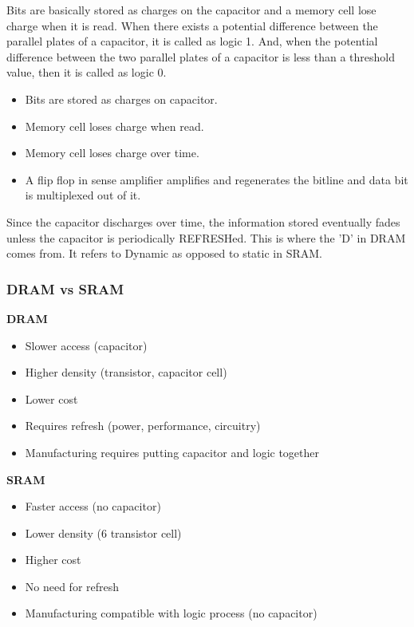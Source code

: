 Bits are basically stored as charges on the capacitor and a memory cell lose charge when it is read. When there exists a potential difference between the parallel plates of a capacitor, it is called as logic 1. And, when the potential difference between the two parallel plates of a capacitor is less than a threshold value, then it is called as logic 0. 

\begin{itemize}
    \item Bits are stored as charges on capacitor.
    \item Memory cell loses charge when read.
    \item Memory cell loses charge over time.
    \item A flip flop in sense amplifier amplifies and regenerates the bitline and data bit is multiplexed out of it.
\end{itemize}

Since the capacitor discharges over time, the information stored eventually fades unless the capacitor is periodically REFRESHed. This is where the 'D' in DRAM comes from. It refers to Dynamic as opposed to static in SRAM.

\subsubsection{DRAM vs SRAM}
\textbf{DRAM}
\begin{itemize}
    \item Slower access (capacitor)
    \item Higher density (transistor, capacitor cell)
    \item Lower cost
    \item Requires refresh (power, performance, circuitry)
    \item Manufacturing requires putting capacitor and logic together
\end{itemize}

\clearpage
\textbf{SRAM}
\begin{itemize}
    \item Faster access (no capacitor)
    \item Lower density (6 transistor cell)
    \item Higher cost
    \item No need for refresh
    \item Manufacturing compatible with logic process (no capacitor)
\end{itemize}

